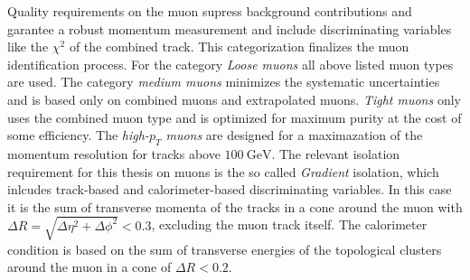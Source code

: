 Quality requirements on the muon supress background contributions and garantee a robust momentum measurement and include discriminating variables like the $\chi^2$ of the combined track. This categorization finalizes the muon identification process. For the category \textit{Loose muons} all above listed muon types are used. The category \textit{medium muons} minimizes the systematic uncertainties and is based only on combined muons and extrapolated muons. \textit{Tight muons} only uses the combined muon type and is optimized for maximum purity at the cost of some efficiency. The \textit{high-$p_T$ muons} are designed for  a maximazation of the momentum resolution for tracks above $\SI{100}{\giga\electronvolt}$. \cite{muPerformance}\newline
The relevant isolation requirement for this thesis on muons is the so called \textit{Gradient} isolation, which inlcudes track-based and calorimeter-based discriminating variables. In this case it is the sum of transverse momenta of the tracks in a cone around the muon with $\Delta R=\sqrt{\Delta\eta^2+\Delta\phi^2}<0.3$, excluding the muon track itself. The calorimeter condition is based on the sum of transverse energies of the topological clusters around the muon in a cone of $\Delta R<0.2$. \cite{muPerformance}\cite{varcone}     
%
%

